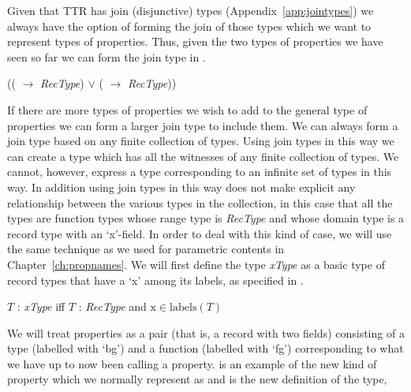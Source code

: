  
Given that TTR has join
(disjunctive) types (Appendix~\ref{app:jointypes}) we always have the
option of forming the join of those types which we want to represent
types of properties.  Thus, given the two types of properties we have
seen so far we can form the join type in \nexteg{}.
\begin{ex} 
(( $\rightarrow$
\textit{RecType}) $\vee$ ( $\rightarrow$
\textit{RecType}))
\label{ex:indorrecppty} 
\end{ex} 
If there are more types of properties we wish to add to the general
type of properties we can form a larger join type to include them.  We
can always form a join type based on any finite collection of types.
Using join types in this way we can create a type which has all the
witnesses of any finite collection of types.  We cannot, however, express a type
corresponding to an infinite set of types in this way.  In addition
using join types in this way does not make
explicit any relationship between the various types in the collection,
in this case that all the types are function types
whose range type is \textit{RecType} and whose domain type is a
record type with an `x'-field.  In order to deal with this
kind of case, we will use the same technique as we used for parametric
contents in Chapter~\ref{ch:propnames}.  We will first define the type
\textit{xType} as a basic type of record types that have a `x' among its
labels, as specified in \nexteg{}.
\begin{ex} 
$T$ : \textit{xType} iff $T$ : \textit{RecType} and $\text{x}\in\mathrm{labels}(T)$ 
\end{ex} 
  We will treat properties as a
pair (that is, a record with two fields) consisting of a type (labelled with `bg') and a function
(labelled with `fg') corresponding to what we have up to now
been calling a property.   is an example of the new kind of
property which we normally represent as  and  is the new definition of the type,
